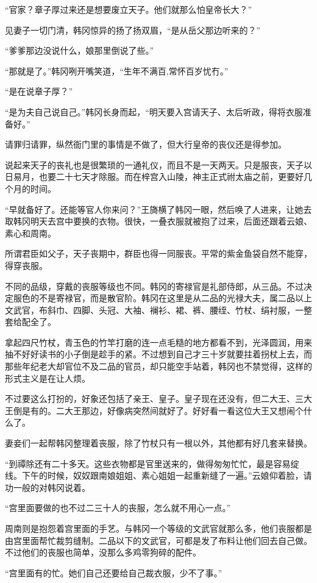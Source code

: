 “官家？章子厚过来还是想要废立天子。他们就那么怕皇帝长大？”

见妻子一切门清，韩冈惊异的扬了扬双眉，“是从岳父那边听来的？”

“爹爹那边没说什么，娘那里倒说了些。”

“那就是了。”韩冈咧开嘴笑道，“生年不满百,常怀百岁忧冇。”

“是在说章子厚？”

“是为夫自己说自己。”韩冈长身而起，“明天要入宫请天子、太后听政，得将衣服准备好。”

请罪归请罪，纵然衙门里的事情是不做了，但大行皇帝的丧仪还是得参加。

说起来天子的丧礼也是很繁琐的一通礼仪，而且不是一天两天。只是服丧，天子以日易月，也要二十七天才除服。而在梓宫入山陵，神主正式祔太庙之前，更要好几个月的时间。

“早就备好了。还能等官人你来问？”王旖横了韩冈一眼，然后唤了人进来，让她去取韩冈明天去宫中要换的衣物。很快，一叠衣服就被抱了过来，后面还跟着云娘、素心和周南。

所谓君臣如父子，天子丧期中，群臣也得一同服丧。平常的紫金鱼袋自然不能穿，得穿丧服。

不同的品级，穿戴的丧服等级也不同。韩冈的寄禄官是礼部侍郎，从三品。不过决定服色的不是寄禄官，而是散官阶。韩冈在这里是从二品的光禄大夫，属二品以上文武官，布斜巾、四脚、头冠、大袖、襕衫、裙、裤、腰绖、竹杖、绢衬服，一整套给配全了。

拿起四尺竹杖，青玉色的竹竿打磨的连一点毛糙的地方都看不到，光泽圆润，用来抽不好好读书的小子倒是趁手的紧。不过想到自己才三十岁就要拄着拐杖上去，而那些年纪老大却官位不及二品的官员，却只能空手站着，韩冈也不禁觉得，这样的形式主义是在让人烦。

不过要这么打扮的，好象还包括了亲王、皇子。皇子现在还没有，但二大王、三大王倒是有的。二大王那边，好像病突然间就好了。好好看一看这位大王又想闹个什么了。

妻妾们一起帮韩冈整理着丧服，除了竹杖只有一根以外，其他都有好几套来替换。

“到禫除还有二十多天。这些衣物都是官里送来的，做得匆匆忙忙，最是容易绽线。下午的时候，奴奴跟南娘姐姐、素心姐姐一起重新缝了一遍。”云娘仰着脸，请功一般的对韩冈说着。

“宫里面要做的也不过二三十人的丧服，怎么就不用心一点。”

周南则是抱怨着宫里面的手艺。与韩冈一个等级的文武官就那么多，他们丧服都是由宫里面帮忙裁剪缝制。二品以下的文武官，可都是发了布料让他们回去自己做。不过他们的丧服也简单，没那么多鸡零狗碎的配件。

“宫里面有的忙。她们自己还要给自己裁衣服，少不了事。”

